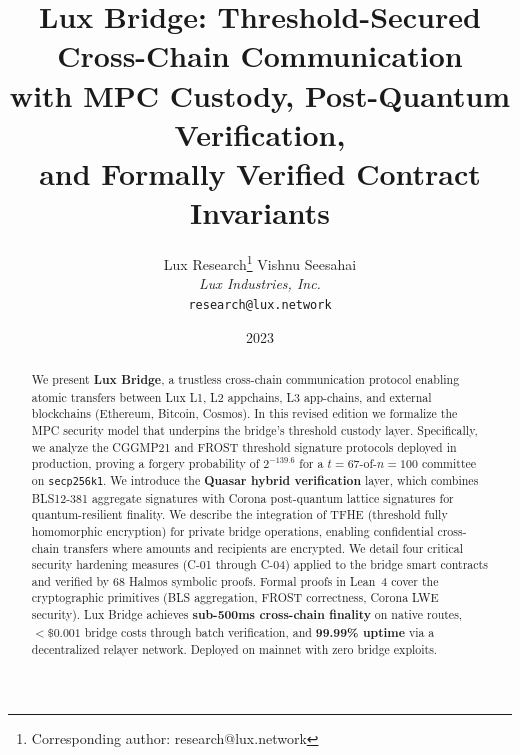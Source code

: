 \documentclass[11pt]{article}
\title{Lux Bridge: Threshold-Secured Cross-Chain Communication\\with MPC Custody, Post-Quantum Verification,\\and Formally Verified Contract Invariants}
\author{
Lux Research\thanks{Corresponding author: research@lux.network}
\quad
Vishnu Seesahai\\
\textit{Lux Industries, Inc.}\\
\texttt{research@lux.network}
}
\date{2023}
\begin{document}
\luxcoverpage

\begin{abstract}
We present \textbf{Lux Bridge}, a trustless cross-chain communication protocol enabling atomic transfers between Lux L1, L2 appchains, L3 app-chains, and external blockchains (Ethereum, Bitcoin, Cosmos). In this revised edition we formalize the MPC security model that underpins the bridge's threshold custody layer. Specifically, we analyze the CGGMP21 and FROST threshold signature protocols deployed in production, proving a forgery probability of $2^{-139.6}$ for a $t = 67$-of-$n = 100$ committee on \texttt{secp256k1}. We introduce the \textbf{Quasar hybrid verification} layer, which combines BLS12-381 aggregate signatures with Corona post-quantum lattice signatures for quantum-resilient finality. We describe the integration of TFHE (threshold fully homomorphic encryption) for private bridge operations, enabling confidential cross-chain transfers where amounts and recipients are encrypted. We detail four critical security hardening measures (C-01 through C-04) applied to the bridge smart contracts and verified by 68 Halmos symbolic proofs. Formal proofs in Lean~4 cover the cryptographic primitives (BLS aggregation, FROST correctness, Corona LWE security). Lux Bridge achieves \textbf{sub-500ms cross-chain finality} on native routes, \textbf{$< \$0.001$} bridge costs through batch verification, and \textbf{99.99\% uptime} via a decentralized relayer network. Deployed on mainnet with zero bridge exploits.
\end{abstract}





















\end{document}
